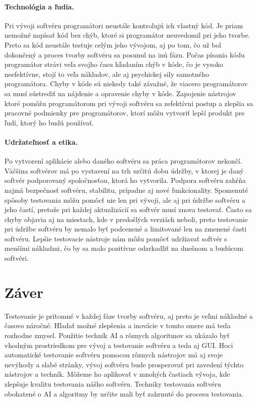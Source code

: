 \documentclass[10pt,twoside,slovak,a4paper]{article}
\begin{document}
\paragraph{Technológia a ľudia.}
Pri vývoji softvéru programátori neustále kontrolujú ich vlastný kód. Je priam nemožné napísať kód bez chýb, ktoré si programátor neuvedomil pri jeho tvorbe. Preto sa kód neustále testuje celým jeho vývojom, aj po tom, čo už bol dokončený a proces tvorby softvéru sa posunul na inú fázu. Počas písania kódu programátor strávi veľa svojho času hľadaním chýb v kóde, čo je vysoko neefektívne, stojí to veľa nákladov, ale aj psychickej sily samotného programátora. Chyby v kóde sú niekedy také závažné, že viacero programátorov sa musí sústrediť na nájdenie a opravenie chyby v kóde. Zapojenie nástrojov ktoré pomôžu programátorom pri vývoji softvéru sa zefektívni postup a zlepšia sa pracovné podmienky pre programátorov, ktorí môžu vytvoriť lepší produkt pre ľudí, ktorý ho budú používať.
\paragraph{Udržateľnosť a etika.}
Po vytvorení aplikácie alebo daného softvéru sa práca programátorov nekončí. Väčšina softvérov má po vystavení na trh určitú dobu údržby, v ktorej je daný softvér podporovaný spoločnosťou, ktorá ho vytvorila. Podpora softvéru zahŕňa najmä bezpečnosť softvéru, stabilitu, prípadne aj nové funkcionality. Spomenuté spôsoby testovania môžu pomôcť nie len pri vývoji, ale aj pri údržbe softvéru a jeho častí, pretože pri každej aktualizácií sa softvér musí znova testovať. Často sa chyby objavia aj na miestach, kde v predošlých verziách neboli, preto testovanie pri údržbe softvéru by nemalo byť podcenené a limitované len na zmenené časti softvéru. Lepšie testovacie nástroje nám môžu pomôcť udržiavať softvér s menšími nákladmi, čo by sa malo pozitívne odzrkadliť na dnešnom a budúcom softvéri.

\section{Záver} \label{zaver}

Testovanie je prítomné v každej fáze tvorby softvéru, aj preto je veľmi nákladné a časovo náročné. Hľadať možné zlepšenia a inovácie v tomto smere má teda rozhodne zmysel. Použitie techník AI a rôznych algoritmov sa ukázalo byť vhodným prostriedkom pre vývoj a testovanie softvéru a teda aj GUI. Hoci automatické testovanie softvéru pomocou rôznych nástrojov má aj svoje nevýhody a slabé stránky, vývoj softvéru bude prosperovať pri zavedení týchto nástrojov a techník. Môžeme ho aplikovať v mnohých častiach vývoja, kde zlepšuje kvalitu testovania nášho softvéru. Techniky testovania softvéru obohatené o AI a algoritmy by určite mali byť zahrnuté do procesu testovania.


 
\end{document}
